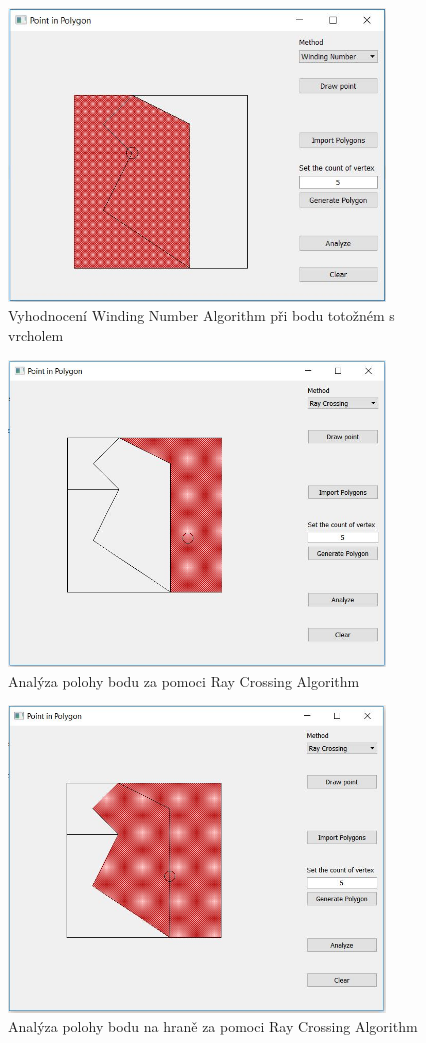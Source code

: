 \documentclass[a4paper, 12pt]{article}
\begin{document}
\begin{figure}[h!]
	\centering
	\includegraphics[width=10cm]{winding_vertex.jpg}
	\caption{Vyhodnocení Winding Number Algorithm při bodu totožném s vrcholem}
\end{figure}

\begin{figure}[h!]
	\centering
	\includegraphics[width=10cm]{ray_inside.jpg}
	\caption{Analýza polohy bodu za pomoci Ray Crossing Algorithm}
\end{figure}

\begin{figure}[h!]
	\centering
	\includegraphics[width=10cm]{ray_boundary.jpg}
	\caption{Analýza polohy bodu na hraně za pomoci Ray Crossing Algorithm}
\end{figure}
\end{document}
